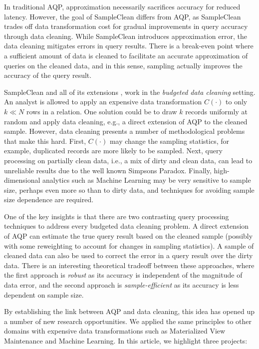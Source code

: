 In traditional AQP, approximation necessarily sacrifices accuracy for reduced latency. 
However, the goal of SampleClean differs from AQP, as SampleClean trades off data transformation cost for gradual improvements in query accuracy through data cleaning.
While SampleClean introduces approximation error, the data cleaning mitigates errors in query results.
There is a break-even point where a sufficient amount of data is cleaned to facilitate an accurate approximation of queries on the cleaned data, and in this sense, sampling actually improves the accuracy of the query result.

SampleClean \cite{wang1999sample} and all of its extensions \cite{krishnan2015svc}, work in the \emph{budgeted data cleaning} setting. 
An analyst is allowed to apply an expensive data transformation $C(\cdot)$ to only $k\ll N$ rows in a relation.
One solution could be to draw $k$ records uniformly at random and apply data cleaning, e.g., a direct extension of AQP to the cleaned sample.
However, data cleaning presents a number of methodological problems that make this hard.
First, $C(\cdot)$ may change the sampling statistics, for example, duplicated records are more likely to be sampled.
Next, query processing on partially clean data, i.e., a mix of dirty and clean data, can lead to unreliable results due to the well known Simpsons Paradox.
Finally, high-dimensional analytics such as Machine Learning may be very sensitive to sample size, perhaps even more so than to dirty data, and techniques for avoiding sample size dependence are required.

One of the key insights is that there are two contrasting query processing techniques to address every budgeted data cleaning problem.
A direct extension of AQP can estimate the true query result based on the cleaned sample (possibly with some reweighting to account for changes in sampling statistics). 
A sample of cleaned data can also be used to correct the error in a query result over the dirty data.
There is an interesting theoretical tradeoff between these approaches, where the first approach is \emph{robust} as its accuracy is independent of the magnitude of data error, and the second approach is \emph{sample-efficient} as its accuracy is less dependent on sample size.

By establishing the link between AQP and data cleaning, this idea has opened up a number of new research opportunities. 
We applied the same principles to other domains with expensive data transformations such as Materialized View Maintenance and Machine Learning.
In this article, we highlight three projects:

